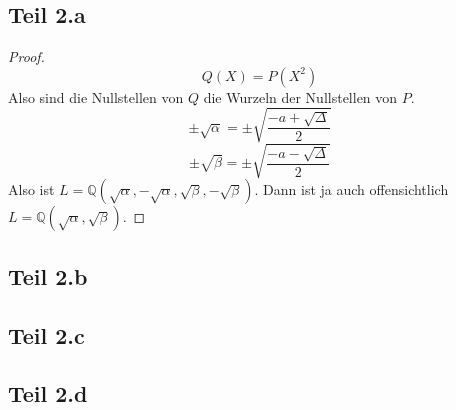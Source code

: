 \documentclass[10pt,a4paper]{article}
\begin{document}
\subsection{Teil 2.a}

\begin{proof}
  \begin{equation}
    Q(X) = P(X^{2})
  \end{equation}
  Also sind die Nullstellen von $Q$ die Wurzeln der Nullstellen von $P$.
  \begin{equation}
    \pm \sqrt{\alpha} = \pm \sqrt{\frac{-a + \sqrt{\Delta}}{2}}
  \end{equation}
  \begin{equation}
    \pm \sqrt{\beta} = \pm \sqrt{\frac{-a - \sqrt{\Delta}}{2}}
  \end{equation}
  Also ist $L = \mathbb{Q}(\sqrt{\alpha}, -\sqrt{\alpha}, \sqrt{\beta}, -\sqrt{\beta})$.
  Dann ist ja auch offensichtlich $L = \mathbb{Q}(\sqrt{\alpha}, \sqrt{\beta})$.
\end{proof}

\subsection{Teil 2.b}

\subsection{Teil 2.c}

\subsection{Teil 2.d}
\end{document}
